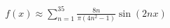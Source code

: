 \documentclass[preview]{standalone}
\begin{document}
\begin{align*}
f(x) \approx \sum_{n=1}^{35} \frac{8n}{\pi(4n^2-1)} \sin(2nx)
\end{align*}
\end{document}
